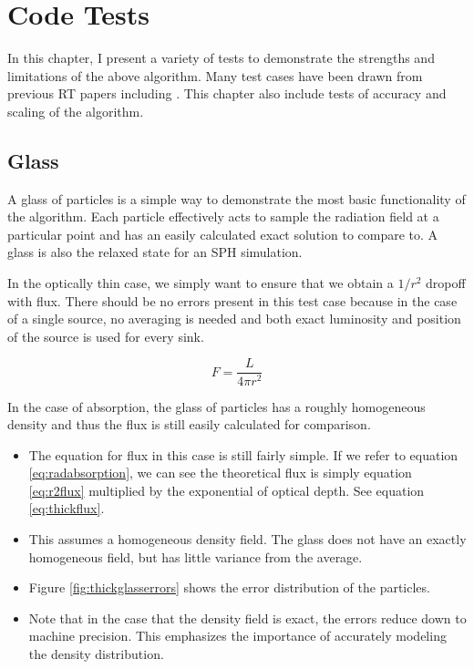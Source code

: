 \pagestyle{fancy}
\headheight 20pt
\chead{}
\lfoot{}
\cfoot{\thepage}
\rfoot{}
\renewcommand{\headrulewidth}{0.1pt}
\renewcommand{\footrulewidth}{0.1pt}


\chapter{Code Tests}
\label{chap:codetests}
\thispagestyle{fancy}

In this chapter, I present a variety of tests to demonstrate the strengths and limitations of the above algorithm. Many test cases have been drawn from previous RT papers including \citet{ilievEt06,gendelevKrumholz12,skinnerOstriker13}. This chapter also include tests of accuracy and scaling of the algorithm.

\section{Glass}
\label{sec:glass}

A glass of particles is a simple way to demonstrate the most basic functionality of the algorithm. Each particle effectively acts to sample the radiation field at a particular point and has an easily calculated exact solution to compare to. A glass is also the relaxed state for an SPH simulation.

In the optically thin case, we simply want to ensure that we obtain a $1/r^2$ dropoff with flux. There should be no errors present in this test case because in the case of a single source, no averaging is needed and both exact luminosity and position of the source is used for every sink.

\begin{equation}
\label{eq:r2flux}
F = \frac{L}{4\pi r^2}
\end{equation}

In the case of absorption, the glass of particles has a roughly homogeneous density and thus the flux is still easily calculated for comparison.

\begin{itemize}
\item The equation for flux in this case is still fairly simple. If we refer to equation \ref{eq:radabsorption}, we can see the theoretical flux is simply equation \ref{eq:r2flux} multiplied by the exponential of optical depth. See equation \ref{eq:thickflux}.
\item This assumes a homogeneous density field. The glass does not have an exactly homogeneous field, but has little variance from the average.
\item Figure \ref{fig:thickglasserrors} shows the error distribution of the particles.
\item Note that in the case that the density field is exact, the errors reduce down to machine precision. This emphasizes the importance of accurately modeling the density distribution.
\end{itemize}

